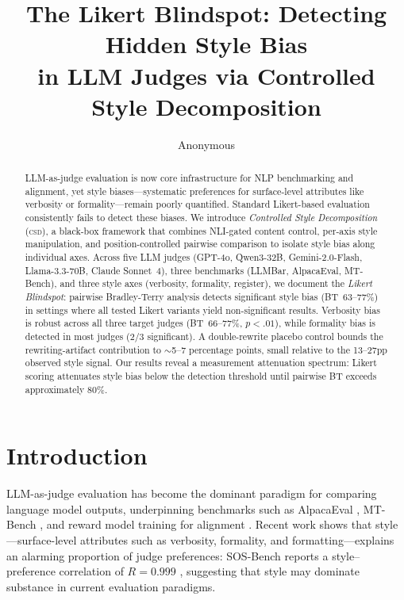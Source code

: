 \documentclass[11pt]{article}
\title{The Likert Blindspot: Detecting Hidden Style Bias\\in LLM Judges via Controlled Style Decomposition}
\author{Anonymous}
\date{}
\newcommand{\csd}{\textsc{csd}}
\begin{document}
\maketitle

\begin{abstract}
LLM-as-judge evaluation is now core infrastructure for NLP benchmarking and alignment, yet style biases---systematic preferences for surface-level attributes like verbosity or formality---remain poorly quantified.
Standard Likert-based evaluation consistently fails to detect these biases.
We introduce \emph{Controlled Style Decomposition} (\csd{}), a black-box framework that combines NLI-gated content control, per-axis style manipulation, and position-controlled pairwise comparison to isolate style bias along individual axes.
Across five LLM judges (GPT-4o, Qwen3-32B, Gemini-2.0-Flash, Llama-3.3-70B, Claude Sonnet~4), three benchmarks (LLMBar, AlpacaEval, MT-Bench), and three style axes (verbosity, formality, register), we document the \emph{Likert Blindspot}: pairwise Bradley-Terry analysis detects significant style bias (BT~63--77\%) in settings where all tested Likert variants yield non-significant results.
Verbosity bias is robust across all three target judges (BT~66--77\%, $p < .01$), while formality bias is detected in most judges (2/3 significant).
A double-rewrite placebo control bounds the rewriting-artifact contribution to ${\sim}$5--7 percentage points, small relative to the 13--27pp observed style signal.
Our results reveal a measurement attenuation spectrum: Likert scoring attenuates style bias below the detection threshold until pairwise BT exceeds approximately 80\%.
\end{abstract}

\section{Introduction}

LLM-as-judge evaluation has become the dominant paradigm for comparing language model outputs, underpinning benchmarks such as AlpacaEval \cite{li2024alpacaeval}, MT-Bench \cite{zheng2024chatbot}, and reward model training for alignment \cite{ouyang2022training}.
Recent work shows that style---surface-level attributes such as verbosity, formality, and formatting---explains an alarming proportion of judge preferences: SOS-Bench reports a style--preference correlation of $R = 0.999$ \cite{sun2024sosbench}, suggesting that style may dominate substance in current evaluation paradigms.
\end{document}

